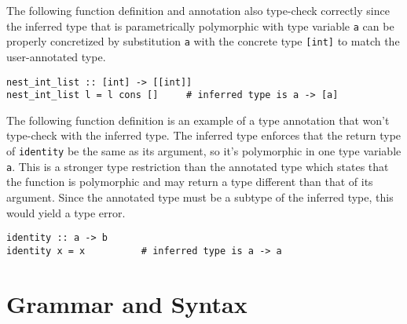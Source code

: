 \documentclass[5pt]{article}
\begin{document}
The following function definition and annotation also type-check correctly since the inferred type that is parametrically polymorphic with type variable \texttt{a} can be properly concretized by substitution \texttt{a} with the concrete type \texttt{[int]} to match the user-annotated type. \\

\begin{lstlisting}[language=rippl]
nest_int_list :: [int] -> [[int]]
nest_int_list l = l cons []     # inferred type is a -> [a]
\end{lstlisting}

The following function definition is an example of a type annotation that won't type-check with the inferred type. The inferred type enforces that the return type of \texttt{identity} be the same as its argument, so it's polymorphic in one type variable \texttt{a}. This is a stronger type restriction than the annotated type which states that the function is polymorphic and may return a type different than that of its argument. Since the annotated type must be a subtype of the inferred type, this would yield a type error. \\

\begin{lstlisting}[language=rippl]
identity :: a -> b
identity x = x          # inferred type is a -> a
\end{lstlisting}
\pagebreak

\section{Grammar and Syntax}
\end{document}
